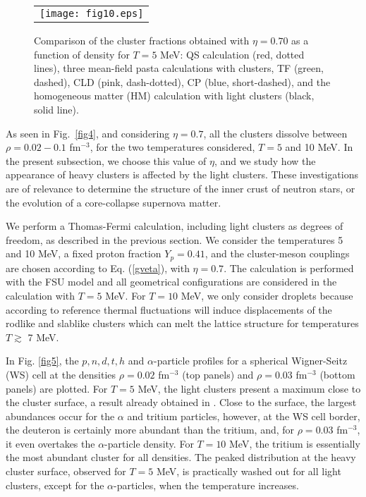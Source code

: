 \documentclass[aps,prc,nofootinbib,twocolumn,showpacs]{revtex4-1}
\begin{document}
\begin{figure*}[!htbp]
	\begin{tabular}{c}
     \texttt{[image: fig10.eps]}\\
    \end{tabular}
    \caption{Comparison of the cluster fractions obtained with
     $\eta=0.70$ as a function of density 
     for $T=5$ MeV:  QS calculation (red, dotted lines),
      three mean-field pasta calculations with clusters,
    TF (green, dashed), CLD (pink, dash-dotted), CP (blue,
    short-dashed), and the homogeneous matter (HM) calculation with light
    clusters (black, solid line).}
\label{fig10}
\end{figure*}

As seen in Fig.~\ref{fig4}, and considering $\eta=0.7$, all
  the clusters dissolve between $\rho=0.02-0.1$ fm$^{-3}$, for the two
  temperatures considered, $T=5$ and 10 MeV.  In the present subsection, we 
  choose this value of $\eta$, and we study how the appearance of
  heavy clusters is affected by the light clusters. These investigations are 
of relevance to determine the structure of the inner crust of neutron
stars, or the evolution of a core-collapse supernova matter.


We perform a Thomas-Fermi calculation,   including light clusters as degrees of
freedom, as described in the previous section. We consider the  temperatures  5 and 10 MeV, a fixed proton fraction
$Y_p=0.41$, and the cluster-meson couplings  are chosen according to Eq.
(\ref{gveta}), with
$\eta=0.7$. The calculation is performed with the FSU \cite{fsu} model
and  all geometrical configurations are considered in the calculation
with $T=5$ MeV.  For $T=10$ MeV, we only consider droplets because according
to reference  \cite{pethick1998} thermal fluctuations will
induce displacements of the rodlike and slablike clusters  which can
melt the lattice structure for temperatures  $T\gtrsim$ 7 MeV.


 
In Fig. \ref{fig5},  the $p, n, d, t, h$ and
$\alpha$-particle profiles for a spherical Wigner-Seitz (WS) cell at the densities
$\rho=0.02$ fm$^{-3}$ (top panels)  and $\rho=0.03$ fm$^{-3}$  (bottom
panels) are plotted.     
 For $T=5$ MeV, the light clusters present a maximum close to the
 cluster surface,  a result already
obtained in \cite{typelAIP}. Close to the surface, the largest
abundances occur  for the $\alpha$ and tritium particles, however, at the WS
cell border, the deuteron is certainly more abundant than the tritium,
and, for $\rho=0.03$ fm$^{-3}$, it even overtakes the $\alpha$-particle
density. For $T=10$ MeV, the tritium is essentially the most abundant
cluster for all densities. 
The peaked distribution at the heavy cluster surface, observed for $T=5$ MeV,  is practically washed out for all
light clusters, except for the $\alpha$-particles, when  the temperature increases.
\end{document}
